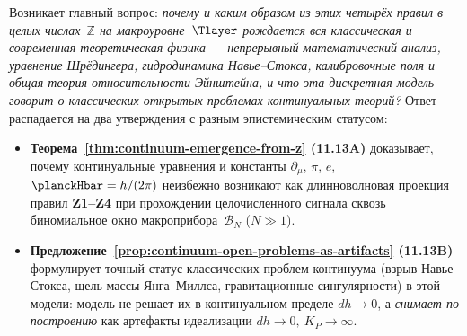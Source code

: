 Возникает главный вопрос: \emph{почему и каким образом из этих четырёх правил в целых числах~$\mathbb{Z}$ на макроуровне~$\Tlayer$
рождается вся классическая и современная теоретическая физика --- непрерывный математический анализ, уравнение Шрёдингера,
гидродинамика Навье--Стокса, калибровочные поля и общая теория относительности Эйнштейна, и что эта дискретная модель
говорит о классических открытых проблемах континуальных теорий?}
Ответ распадается на два утверждения с разным эпистемическим статусом:
\begin{itemize}[nosep,leftmargin=*]
\item \textbf{Теорема~\ref{thm:continuum-emergence-from-z} (11.13A)} доказывает, почему континуальные уравнения и константы $\partial_\mu$, $\pi$, $e$, $\planckHbar=h/(2\pi)$ неизбежно возникают как длинноволновая проекция правил \textbf{Z1--Z4} при прохождении целочисленного сигнала сквозь биномиальное окно макроприбора~$\mathcal{B}_N$ ($N\gg 1$).
\item \textbf{Предложение~\ref{prop:continuum-open-problems-as-artifacts} (11.13B)} формулирует точный статус классических проблем континуума (взрыв Навье--Стокса, щель массы Янга--Миллса, гравитационные сингулярности) в этой модели: модель не решает их в континуальном пределе $dh\to 0$, а \emph{снимает по построению} как артефакты идеализации $dh\to 0,\ K_P\to\infty$.
\end{itemize}

